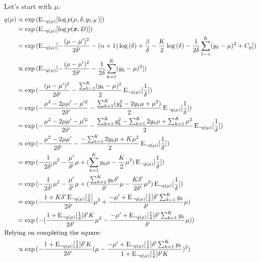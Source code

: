 \documentclass[12pt]{article}
\newcommand{\E}{\operatorname{E}}
\begin{document}
Let's start with $\mu$:
\begin{align}
    q(\mu) &\propto \exp{(\E_{\neg q(\mu)}[\log{p(\mu, \delta, y_{1:K})}])}
    \nonumber \\
    &= \exp{(\E_{\neg q(\mu)}[\log{p(\bm{x}, D)}])}
    \nonumber \\
    &= \exp{(\E_{\neg q(\mu)}[-\frac{(\mu-\mu')^2}{2\delta'}
    - (\alpha+1)\log{(\delta)} + \frac{\beta}{\delta}
    - \frac{K}{2}\log{(\delta)}
    - \frac{1}{2\delta} \sum_{k=1}^{K} (y_{k} - \mu)^2
    + C_p])}
    \nonumber \\
    &\propto \exp{(\E_{\neg q(\mu)}[-\frac{(\mu-\mu')^2}{2\delta'}
    - \frac{1}{2\delta} \sum_{k=1}^{K} (y_{k} - \mu)^2])}
    \nonumber \\
    &= \exp{(-\frac{(\mu-\mu')^2}{2\delta'}
        - \frac{\sum_{k=1}^{K}(y_{k}-\mu)^2}{2}\E_{\neg q(\mu)}[\frac{1}{\delta}]
    )}
    \nonumber \\
    &= \exp{(-\frac{\mu^2 - 2\mu\mu' -\mu'^2}{2\delta'}
        - \frac{\sum_{k=1}^{K}(y_{k}^2 -2y_{k}\mu + \mu^2)}{2}\E_{\neg q(\mu)}[\frac{1}{\delta}]
    )}
    \nonumber \\
    &= \exp{(-\frac{\mu^2 - 2\mu\mu' -\mu'^2}{2\delta'}
        - \frac{\sum_{k=1}^{K}y_{k}^2 -\sum_{k=1}^{K}2y_{k}\mu + \sum_{k=1}^{K}\mu^2}{2}\E_{\neg q(\mu)}[\frac{1}{\delta}]
    )}
    \nonumber \\
    &\propto \exp{(-\frac{\mu^2 - 2\mu\mu'}{2\delta'}
        - \frac{-\sum_{k=1}^{K}2y_{k}\mu + K\mu^2}{2}\E_{\neg q(\mu)}[\frac{1}{\delta}]
    )}
    \nonumber \\
    &= \exp{(-\frac{1}{2\delta'}\mu^2 - \frac{\mu'}{\delta'}\mu
        + (\sum_{k=1}^{K}y_{k}\mu - \frac{K}{2}\mu^2)\E_{\neg q(\mu)}[\frac{1}{\delta}]
    )}
    \nonumber \\
    &= \exp{(-\frac{1}{2\delta'}\mu^2 - \frac{\mu'}{\delta'}\mu
        + (\frac{\sum_{k=1}^{K}y_{k}\delta'}{\delta'}\mu
        - \frac{K\delta'}{2\delta'}\mu^2)\E_{\neg q(\mu)}[\frac{1}{\delta}]
    )}
    \nonumber \\
    &= \exp{(-\frac{1+K\delta'\E_{\neg q(\mu)}[\frac{1}{\delta}]}{2\delta'}\mu^2
    + \frac{-\mu' + \E_{\neg q(\mu)}[\frac{1}{\delta}]\delta'\sum_{k=1}^{K}y_{k}}{\delta'}\mu
    )}
    \nonumber \\
    &= \exp{(-(\frac{1+\E_{\neg q(\mu)}[\frac{1}{\delta}]\delta'K}{2\delta'}\mu^2
    - \frac{-\mu' + \E_{\neg q(\mu)}[\frac{1}{\delta}]\delta'\sum_{k=1}^{K}y_{k}}{\delta'}\mu
    ))}
    \nonumber \\
    \intertext{Relying on completing the square:}
    &\propto
    \exp{(-\frac{1+\E_{\neg q(\mu)}[\frac{1}{\delta}]\delta'K}{2\delta'}
    (\mu
    - \frac{
    -\mu' + \E_{\neg q(\mu)}[\frac{1}{\delta}]\delta'\sum_{k=1}^{K}y_{k}}
    {1 + \E_{\neg q(\mu)}[\frac{1}{\delta}]\delta'K})^2
    )}
\end{align}
\end{document}
